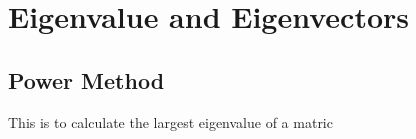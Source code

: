 \section{Eigenvalue and Eigenvectors}

\subsection{Power Method}
This is to calculate the largest eigenvalue of a matric